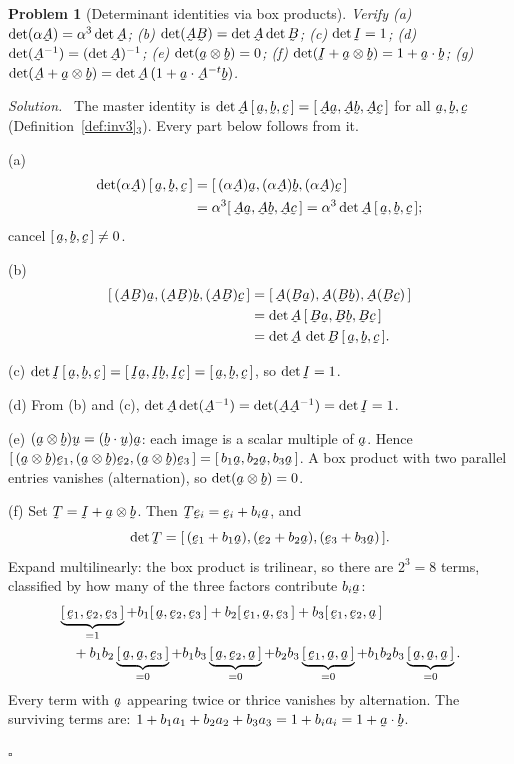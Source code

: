 \documentclass[17pt,a4paper]{extreport}
\DeclareRobustCommand{\vek}[1]{\underaccent{\tilde}{#1}}
\newcommand{\I}{\vek{I}}
\newcommand{\ba}{\vek{a}}
\newcommand{\bb}{\vek{b}}
\newcommand{\bc}{\vek{c}}
\newcommand{\bu}{\vek{u}}
\newcommand{\be}{\vek{e}}
\newcommand{\bA}{\vek{A}}
\newcommand{\bB}{\vek{B}}
\newcommand{\bT}{\vek{T}}
\newcommand{\tbox}[3]{[\,#1,#2,#3\,]}
\newcommand{\ip}[2]{#1\cdot#2}
\theoremstyle{scplain}
\theoremstyle{scdefn}
\theoremstyle{scplain}
\newtheorem{problem}{Problem}
\newenvironment{solution}
 {\par\smallskip\noindent\textit{Solution.}\ }
 {\hfill$\square$\par\medskip}
\begin{document}
\begin{problem}[Determinant identities via box products]
Verify (a) $\det(\alpha\bA)=\alpha^3\det\bA$; (b)
$\det(\bA\bB)=\det\bA\det\bB$; (c) $\det\I=1$; (d)
$\det(\bA^{-1})=(\det\bA)^{-1}$; (e) $\det(\ba\otimes\bb)=0$; (f)
$\det(\I+\ba\otimes\bb)=1+\ip\ba\bb$; (g)
$\det(\bA+\ba\otimes\bb)=\det\bA\,(1+\ip\ba{\bA^{-t}\bb})$.
\end{problem}
\begin{solution}
The master identity is $\det\bA\,\tbox\ba\bb\bc=\tbox{\bA\ba}{\bA\bb}{\bA\bc}$
for all $\ba,\bb,\bc$ (Definition~\ref{def:inv3}$_3$). Every part below
follows from it.

(a)
\[
\begin{aligned}
\det(\alpha\bA)\,\tbox\ba\bb\bc
&=\tbox{(\alpha\bA)\ba}{(\alpha\bA)\bb}{(\alpha\bA)\bc}\\
&=\alpha^3\tbox{\bA\ba}{\bA\bb}{\bA\bc}
=\alpha^3\det\bA\,\tbox\ba\bb\bc;
\end{aligned}
\]
cancel $\tbox\ba\bb\bc\neq0$.

(b)
\[
\begin{aligned}
\tbox{(\bA\bB)\ba}{(\bA\bB)\bb}{(\bA\bB)\bc}
&=\tbox{\bA(\bB\ba)}{\bA(\bB\bb)}{\bA(\bB\bc)}\\
&=\det\bA\,\tbox{\bB\ba}{\bB\bb}{\bB\bc}\\
&=\det\bA\,\det\bB\,\tbox\ba\bb\bc.
\end{aligned}
\]

(c) $\det\I\,\tbox\ba\bb\bc=\tbox{\I\ba}{\I\bb}{\I\bc}
=\tbox\ba\bb\bc$, so $\det\I=1$.

(d) From (b) and (c), $\det\bA\det(\bA^{-1})=\det(\bA\bA^{-1})=\det\I=1$.

(e) $(\ba\otimes\bb)\bu=(\ip\bb\bu)\ba$: each image is a scalar multiple
of $\ba$. Hence $\tbox{(\ba\otimes\bb)\be_1}{(\ba\otimes\bb)\be_2}
{(\ba\otimes\bb)\be_3}=\tbox{b_1\ba}{b_2\ba}{b_3\ba}$. A box product
with two parallel entries vanishes (alternation), so $\det(\ba\otimes\bb)=0$.

(f) Set $\bT=\I+\ba\otimes\bb$. Then $\bT\be_i=\be_i+b_i\ba$, and
\[
\det\bT=\tbox{(\be_1+b_1\ba)}{(\be_2+b_2\ba)}{(\be_3+b_3\ba)}.
\]
Expand multilinearly: the box product is trilinear, so there are $2^3=8$
terms, classified by how many of the three factors contribute $b_i\ba$:
\[
\begin{aligned}
&\underbrace{\tbox{\be_1}{\be_2}{\be_3}}_{=1}
+b_1\tbox\ba{\be_2}{\be_3}
+b_2\tbox{\be_1}\ba{\be_3}
+b_3\tbox{\be_1}{\be_2}\ba\\
&\quad+b_1b_2\underbrace{\tbox\ba\ba{\be_3}}_{=0}
+b_1b_3\underbrace{\tbox\ba{\be_2}\ba}_{=0}
+b_2b_3\underbrace{\tbox{\be_1}\ba\ba}_{=0}
+b_1b_2b_3\underbrace{\tbox\ba\ba\ba}_{=0}.
\end{aligned}
\]
Every term with $\ba$ appearing twice or thrice vanishes by alternation.
The surviving terms are: $1+b_1a_1+b_2a_2+b_3a_3=1+b_ia_i=1+\ip\ba\bb$.


\end{solution}
\end{document}
